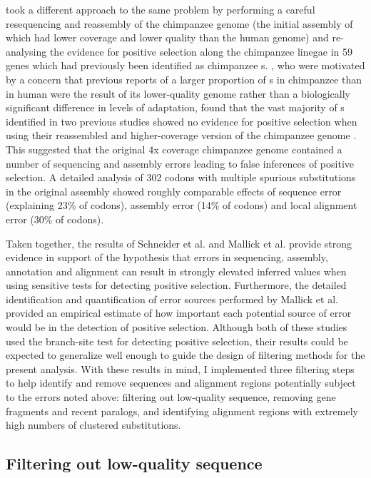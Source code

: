 \citet{Mallick2009} took a different approach to the same problem by
performing a careful resequencing and reassembly of the chimpanzee
genome (the initial assembly of which had lower coverage and lower
quality than the human genome) and re-analysing the evidence for
positive selection along the chimpanzee linegae in 59 genes which had
previously been identified as chimpanzee
\psg{}s. \citeauthor{Mallick2009}, who were motivated by a concern
that previous reports of a larger proportion of \psg{}s in chimpanzee
than in human \citep{Bakewell2007} were the result of its
lower-quality genome rather than a biologically significant difference
in levels of adaptation, found that the vast majority of \psg{}s
identified in two previous studies showed no evidence for positive
selection when using their reassembled and higher-coverage version of
the chimpanzee genome \citep{Mallick2009}. This suggested that the
original 4x coverage chimpanzee genome contained a number of
sequencing and assembly errors leading to false inferences of positive
selection. A detailed analysis of 302 codons with multiple spurious
\nsyn substitutions in the original assembly showed roughly comparable
effects of sequence error (explaining 23\% of codons), assembly error
(14\% of codons) and local alignment error (30\% of codons).

Taken together, the results of Schneider et
al. \citeyearpar{Schneider2009} and Mallick et
al. \citeyearpar{Mallick2009} provide strong evidence in support of
the hypothesis that errors in sequencing, assembly, annotation and
alignment can result in strongly elevated inferred \omg values when
using sensitive tests for detecting positive selection. Furthermore,
the detailed identification and quantification of error sources
performed by Mallick et al. \citeyearpar{Mallick2009} provided an
empirical estimate of how important each potential source of error
would be in the detection of positive selection. Although both of
these studies used the branch-site test for detecting positive
selection, their results could be expected to generalize well enough
to guide the design of filtering methods for the present \sw
analysis. With these results in mind, I implemented three filtering
steps to help identify and remove sequences and alignment regions
potentially subject to the errors noted above: filtering out
low-quality sequence, removing gene fragments and recent paralogs, and
identifying alignment regions with extremely high numbers of clustered
substitutions.

\subsection{Filtering out low-quality sequence}


